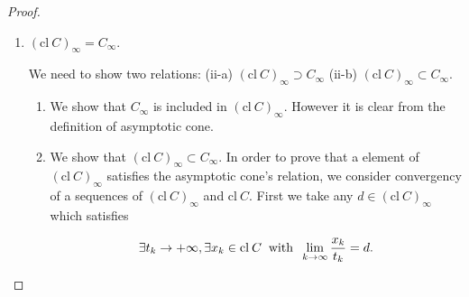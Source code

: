 \documentclass[a4paper,11pt]{jsarticle}
\newcommand{\NaturalNumberSet}{\mathbb{N}}
\begin{document}
\begin{proof}
\begin{enumerate}[label=\roman*,align=CenterWithParen]
\begin{enumerate}[label=i-\alph*,align=CenterWithParen]
        Also we can find that

        \begin{equation}
          \begin{split}
            t_n &\rightarrow \infty \:\text{as}\: n \rightarrow \infty, \\
            x_n &\in C, \:\text{and}\: \\
            \frac{x_n}{t_n} &= \frac{x_{k(n)}^{m(n)}}{t_{k(n)}^{m(n)}} \:\text{or}\: \frac{x_{k(n)}^{m(n)}}{n}. \notag
          \end{split}
        \end{equation}

        Hence we get for each $n \in \NaturalNumberSet$

        \begin{equation}
          0 \leq \left\lVert \frac{x_n}{t_n} - d\right\rVert \leq \left\lVert \frac{x_{k(n)}^{m(n)}}{t_{k(n)}^{m(n)}} - d_{k(n)}\right\rVert + \left\lVert d_{k(n)} -d \right\rVert< \frac{1}{2n} \rightarrow 0 \notag
        \end{equation}

        as $n \rightarrow \infty$.

        Thus $d \in C_{\infty}$, that is, $C_{\infty}$ is a closed set.
      \end{enumerate}
      Then (i)'s proof is completed.
    \item $(\text{cl}\:C)_{\infty} = C_{\infty}$.

    We need to show two relations: (ii-a) $(\text{cl}\:C)_{\infty} \supset C_{\infty}$ (ii-b) $(\text{cl}\:C)_{\infty} \subset C_{\infty}$.

      \begin{enumerate}[label=ii-\alph*,align=CenterWithParen2]
        \item We show that $C_{\infty}$ is included in $(\text{cl}\:C)_{\infty}$. However it is clear from the definition of asymptotic cone.

        \item We show that $(\text{cl}\:C)_{\infty} \subset C_{\infty}$. In order to prove that a element of $(\text{cl}\:C)_{\infty}$ satisfies the asymptotic cone's relation, we consider convergency of a sequences of $(\text{cl}\:C)_{\infty}$ and $\text{cl}\:C$. First we take any $d \in (\text{cl}\:C)_{\infty}$ which satisfies

        \begin{equation}
          \exists t_k \rightarrow + \infty , \exists x_k \in \text{cl}\:C \:\text{ with }\: \lim_{k \to \infty} \frac{x_k}{t_k} = d. \notag
        \end{equation}


\end{enumerate}
\end{enumerate}
\end{proof}
\end{document}
